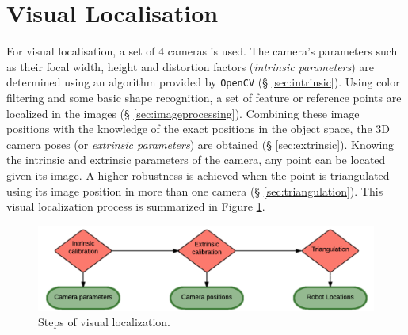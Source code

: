 \section{Visual Localisation}

For visual localisation, a set of 4 cameras is used. The camera's parameters such as their focal width, height and distortion factors (\textit{intrinsic parameters}) are determined using an algorithm provided by \texttt{OpenCV} (§ \ref{sec:intrinsic}). 
Using color filtering and some basic shape recognition, a set of feature or reference points are localized in the images (§ \ref{sec:imageprocessing}).
Combining these image positions with the knowledge of the exact positions in the object space, the 3D camera poses (or \textit{extrinsic parameters}) are obtained (§ \ref{sec:extrinsic}). 
Knowing the intrinsic and extrinsic parameters of the camera, any point can be located given its image. A higher robustness is achieved when the point is triangulated using its image position in more than one camera (§ \ref{sec:triangulation}).
This visual localization process is summarized in Figure \ref{fig:visual}.
\begin{figure}[H]
    \centering
    \includegraphics[width=.7\linewidth]{files/Visual.png}
    \caption{Steps of visual localization.}
    \label{fig:visual}
\end{figure}







\newpage


